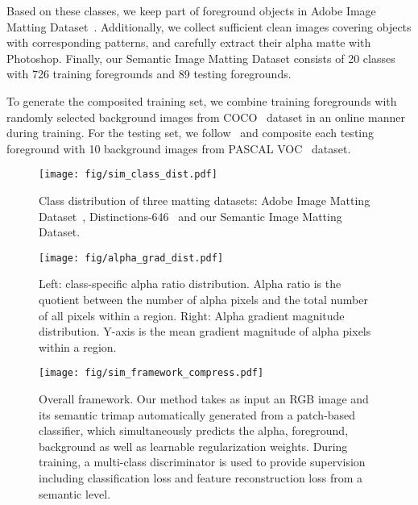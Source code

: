 \documentclass[10pt,twocolumn,letterpaper]{article}
\begin{document}
Based on these classes, we keep part of foreground objects in Adobe Image Matting Dataset~\cite{Xu2017DeepIM}. Additionally, we collect sufficient clean images covering objects with corresponding patterns, and carefully extract their alpha matte with Photoshop. Finally, our Semantic Image Matting Dataset consists of 20 classes with 726 training foregrounds and 89 testing foregrounds. 

To generate the composited training set, we combine training foregrounds with randomly selected background images from COCO~\cite{lin2014microsoft} dataset in an online manner during training. For the testing set, we follow~\cite{Xu2017DeepIM} and composite each testing foreground with 10 background images from PASCAL VOC~\cite{Everingham10} dataset.


\begin{figure}[t]
\hspace{-0.2in}
\centering
\texttt{[image: fig/sim\_class\_dist.pdf]} 
\caption{Class distribution of three matting datasets: Adobe Image Matting Dataset~\cite{Xu2017DeepIM}, Distinctions-646~\cite{qiao2020attention} and our Semantic Image Matting Dataset.}
\label{fig:classes_dist}
\vspace{-10pt}
\end{figure}

\begin{figure}[t]
\hspace{-0.1in}
\texttt{[image: fig/alpha\_grad\_dist.pdf]} 
\caption{
Left: class-specific alpha ratio distribution. Alpha ratio is the quotient between the number of alpha pixels and the total number of all pixels within a region. Right: Alpha gradient magnitude distribution. Y-axis is the mean gradient magnitude of alpha pixels within a region.}
\label{fig:alpha_grad_hist}
\vspace{-10pt}
\end{figure}


\begin{figure*}[t]
\centering 
\texttt{[image: fig/sim\_framework\_compress.pdf]} 
\caption{Overall framework. Our method takes as input an RGB image and its semantic trimap automatically generated from a patch-based classifier, which simultaneously predicts the alpha, foreground, background as well as learnable regularization weights. During training, a multi-class discriminator is used to provide supervision including classification loss and feature reconstruction loss from a semantic level.}
\label{fig:framework}
\vspace{-12pt}
\end{figure*}
\end{document}
